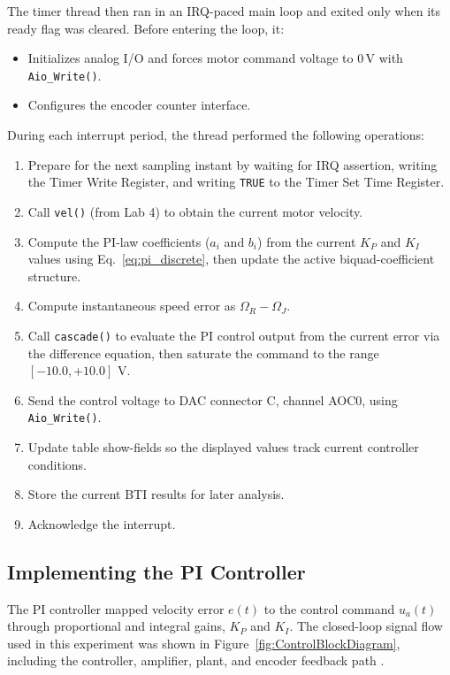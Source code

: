 \documentclass[10pt,twocolumn]{article}
\begin{document}
The timer thread then ran in an IRQ-paced main loop and exited only when its ready flag was cleared. Before entering the loop, it:
\begin{itemize}
	\item Initializes analog I/O and forces motor command voltage to $0\,\text{V}$ with \texttt{Aio\_Write()}.
	\item Configures the encoder counter interface.
\end{itemize}

During each interrupt period, the thread performed the following operations:
\begin{enumerate}
	\item Prepare for the next sampling instant by waiting for IRQ assertion, writing the Timer Write Register, and writing \texttt{TRUE} to the Timer Set Time Register.
	\item Call \texttt{vel()} (from Lab 4) to obtain the current motor velocity.
	\item Compute the PI-law coefficients ($a_i$ and $b_i$) from the current $K_P$ and $K_I$ values using Eq.~\eqref{eq:pi_discrete}, then update the active biquad-coefficient structure.
	\item Compute instantaneous speed error as $\Omega_R - \Omega_J$.
	\item Call \texttt{cascade()} to evaluate the PI control output from the current error via the difference equation, then saturate the command to the range $[-10.0, +10.0]$ V.
	\item Send the control voltage to DAC connector C, channel AOC0, using \texttt{Aio\_Write()}.
	\item Update table show-fields so the displayed values track current controller conditions.
	\item Store the current BTI results for later analysis.
	\item Acknowledge the interrupt.
\end{enumerate}

\subsection{Implementing the PI Controller}
The PI controller mapped velocity error $e(t)$ to the control command $u_a(t)$ through proportional and integral gains, $K_P$ and $K_I$. The closed-loop signal flow used in this experiment was shown in Figure~\ref{fig:ControlBlockDiagram}, including the controller, amplifier, plant, and encoder feedback path \citep{Picone2024}.
\end{document}
